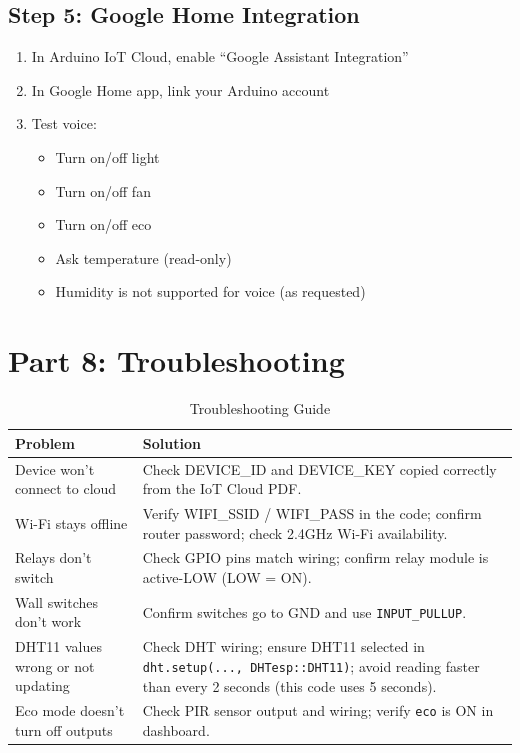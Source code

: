 \documentclass[12pt,a4paper]{article}
\begin{document}
\subsection{Step 5: Google Home Integration}
\begin{enumerate}
\item In Arduino IoT Cloud, enable ``Google Assistant Integration''
\item In Google Home app, link your Arduino account
\item Test voice:
\begin{itemize}
\item Turn on/off light
\item Turn on/off fan
\item Turn on/off eco
\item Ask temperature (read-only)
\item Humidity is not supported for voice (as requested)
\end{itemize}
\end{enumerate}

\newpage
\section{Part 8: Troubleshooting}

\begin{table}[H]
\centering
\begin{tabularx}{\textwidth}{|l|X|}
\hline
\textbf{Problem} & \textbf{Solution} \\
\hline
Device won't connect to cloud & Check DEVICE\_ID and DEVICE\_KEY copied correctly from the IoT Cloud PDF. \\
\hline
Wi-Fi stays offline & Verify WIFI\_SSID / WIFI\_PASS in the code; confirm router password; check 2.4GHz Wi-Fi availability. \\
\hline
Relays don't switch & Check GPIO pins match wiring; confirm relay module is active-LOW (LOW = ON). \\
\hline
Wall switches don't work & Confirm switches go to GND and use \texttt{INPUT\_PULLUP}. \\
\hline
DHT11 values wrong or not updating & Check DHT wiring; ensure DHT11 selected in \texttt{dht.setup(..., DHTesp::DHT11)}; avoid reading faster than every 2 seconds (this code uses 5 seconds). \\
\hline
Eco mode doesn't turn off outputs & Check PIR sensor output and wiring; verify \texttt{eco} is ON in dashboard. \\
\hline
\end{tabularx}
\caption{Troubleshooting Guide}
\label{tab:troubleshooting}
\end{table}
\end{document}
